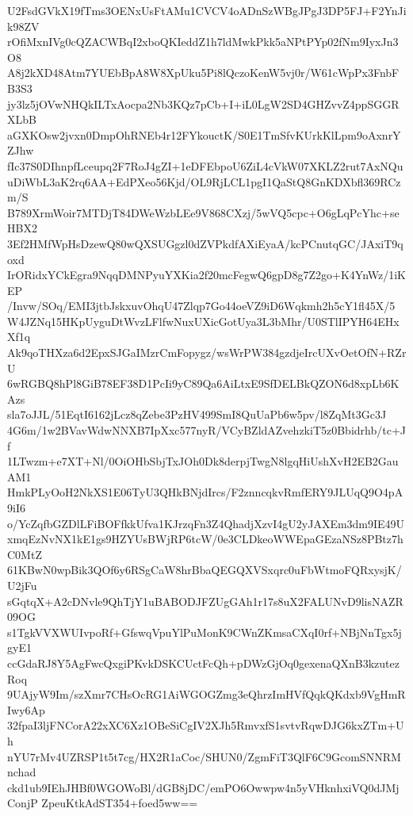U2FsdGVkX19fTms3OENxUsFtAMu1CVCV4oADnSzWBgJPgJ3DP5FJ+F2YnJik98ZV
rOfiMxnIVg0cQZACWBqI2xboQKIeddZ1h7ldMwkPkk5aNPtPYp02fNm9IyxJn3O8
A8j2kXD48Atm7YUEbBpA8W8XpUku5Pi8lQczoKenW5vj0r/W61cWpPx3FnbFB3S3
jy3lz5jOVwNHQkILTxAocpa2Nb3KQz7pCb+I+iL0LgW2SD4GHZvvZ4ppSGGRXLbB
aGXKOsw2jvxn0DmpOhRNEb4r12FYkouctK/S0E1TmSfvKUrkKlLpm9oAxnrYZJhw
fIc37S0DIhnpfLceupq2F7RoJ4gZI+1eDFEbpoU6ZiL4cVkW07XKLZ2rut7AxNQu
uDiWbL3aK2rq6AA+EdPXeo56Kjd/OL9RjLCL1pgI1QaStQ8GnKDXbfl369RCzm/S
B789XrmWoir7MTDjT84DWeWzbLEe9V868CXzj/5wVQ5cpc+O6gLqPcYhc+seHBX2
3Ef2HMfWpHsDzewQ80wQXSUGgzl0dZVPkdfAXiEyaA/kcPCnutqGC/JAxiT9qoxd
IrORidxYCkEgra9NqqDMNPyuYXKia2f20mcFegwQ6gpD8g7Z2go+K4YnWz/1iKEP
/Invw/SOq/EMI3jtbJskxuvOhqU47Zlqp7Go44oeVZ9iD6Wqkmh2h5cY1fl45X/5
W4JZNq15HKpUyguDtWvzLFlfwNuxUXicGotUya3L3bMhr/U0STlIPYH64EHxXf1q
Ak9qoTHXza6d2EpxSJGaIMzrCmFopygz/wsWrPW384gzdjeIrcUXvOetOfN+RZrU
6wRGBQ8hPl8GiB78EF38D1PcIi9yC89Qa6AiLtxE9SfDELBkQZON6d8xpLb6KAzs
sla7oJJL/51EqtI6162jLcz8qZebe3PzHV499SmI8QuUaPb6w5pv/l8ZqMt3Gc3J
4G6m/1w2BVavWdwNNXB7IpXxc577nyR/VCyBZldAZvehzkiT5z0Bbidrhb/tc+Jf
1LTwzm+e7XT+Nl/0OiOHbSbjTxJOh0Dk8derpjTwgN8lgqHiUshXvH2EB2GauAM1
HmkPLyOoH2NkXS1E06TyU3QHkBNjdIrcs/F2znncqkvRmfERY9JLUqQ9O4pA9iI6
o/YcZqfbGZDlLFiBOFfkkUfva1KJrzqFn3Z4QhadjXzvI4gU2yJAXEm3dm9IE49U
xmqEzNvNX1kE1gs9HZYUsBWjRP6tcW/0e3CLDkeoWWEpaGEzaNSz8PBtz7hC0MtZ
61KBwN0wpBik3QOf6y6RSgCaW8hrBbaQEGQXVSxqrc0uFbWtmoFQRxysjK/U2jFu
sGqtqX+A2cDNvle9QhTjY1uBABODJFZUgGAh1r17s8uX2FALUNvD9lisNAZR09OG
s1TgkVVXWUIvpoRf+GfswqVpuYlPuMonK9CWnZKmsaCXqI0rf+NBjNnTgx5jgyE1
ccGdaRJ8Y5AgFwcQxgiPKvkDSKCUctFcQh+pDWzGjOq0gexenaQXnB3kzutezRoq
9UAjyW9Im/szXmr7CHsOcRG1AiWGOGZmg3eQhrzImHVfQqkQKdxb9VgHmRIwy6Ap
32fpaI3ljFNCorA22xXC6Xz1OBeSiCgIV2XJh5RmvxfS1svtvRqwDJG6kxZTm+Uh
nYU7rMv4UZRSP1t5t7cg/HX2R1aCoc/SHUN0/ZgmFiT3QlF6C9GcomSNNRMnchad
ckd1ub9IEhJHBf0WGOWoBl/dGB8jDC/emPO6Owwpw4n5yVHknhxiVQ0dJMjConjP
ZpeuKtkAdST354+foed5ww==
